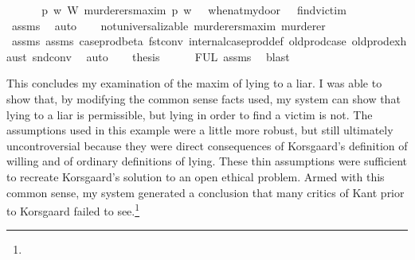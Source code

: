 \begin{isabellebody}
%
\endisadelimproof
%
\isatagproof
{}\isamarkupfalse%
\ {\isacharminus}\ \isanewline
\ \ \isamarkupfalse%
\ {\isachardoublequoteopen}{\isacharparenleft}{\isasymforall}p\ w{\isachardot}\ {\isacharparenleft}W\ murderers{\isacharunderscore}maxim\ p{\isacharparenright}\ w{\isacharparenright}\ {\isasymlongrightarrow}\ {\isacharparenleft}{\isasymTurnstile}\ {\isacharparenleft}when{\isacharunderscore}at{\isacharunderscore}my{\isacharunderscore}door\ \isactrlbold {\isasymrightarrow}\ {\isacharparenleft}\isactrlbold {\isasymnot}\ find{\isacharunderscore}victim{\isacharparenright}{\isacharparenright}{\isacharparenright}{\isachardoublequoteclose}\isanewline
\ \ \ \ \isamarkupfalse%
\ assms{\isacharparenleft}{}{\isacharparenright}\ \isamarkupfalse%
\ auto\isanewline
\ \ \isamarkupfalse%
\ {\isachardoublequoteopen}not{\isacharunderscore}universalizable\ murderers{\isacharunderscore}maxim\ murderer{\isachardoublequoteclose}\isanewline
\ \ \ \ \isamarkupfalse%
\ assms{\isacharparenleft}{}{\isacharparenright}\ assms{\isacharparenleft}{}{\isacharparenright}\ case{\isacharunderscore}prod{\isacharunderscore}beta\ fst{\isacharunderscore}conv\ internal{\isacharunderscore}case{\isacharunderscore}prod{\isacharunderscore}def\ old{\isachardot}prod{\isachardot}case\ old{\isachardot}prod{\isachardot}exhaust\ snd{\isacharunderscore}conv\ \isamarkupfalse%
\ auto\isanewline
\ \ \isamarkupfalse%
\ {\isacharquery}thesis\isanewline
\ \ \ \ \isamarkupfalse%
\ FUL\ assms{\isacharparenleft}{}{\isacharparenright}\ \isamarkupfalse%
\ blast\ \isanewline
{}\isamarkupfalse%
%
\endisatagproof
{\isafoldproof}%
%
\isadelimproof
%
\endisadelimproof
%
\begin{isamarkuptext}%
This concludes my examination of the maxim of lying to a liar. I was able to show that, by
modifying the common sense facts used, my system can show that lying to a liar is permissible, but lying 
in order to find a victim is not. The assumptions used in this example were a little more robust, but still
ultimately uncontroversial because they were direct consequences of Korsgaard's definition of willing 
and of ordinary definitions of lying. These thin assumptions were sufficient to recreate Korsgaard's solution
to an open ethical problem. Armed with this common sense, my system generated 
a conclusion that many critics of Kant prior to Korsgaard failed to see.\footnote{
}
\end{isamarkuptext}
\end{isabellebody}
